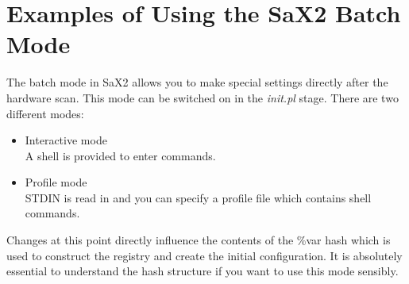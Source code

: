 \chapter{Examples of Using the SaX2 Batch Mode}
\minitoc

The batch mode in SaX2 allows you to make special settings directly after the 
hardware scan. This mode can be switched on in the \textit{init.pl}
stage. There are two different modes:\\
\begin{itemize}
\item Interactive mode\\
      A shell is provided to enter commands.
\item Profile mode\\
      STDIN is read in and you can specify a profile file which contains shell
      commands.
\end{itemize}
Changes at this point directly influence the contents of the 
\%var hash which is used to construct the registry and create the initial
configuration. It is absolutely essential to understand the hash structure if
you want to use this mode sensibly. 

